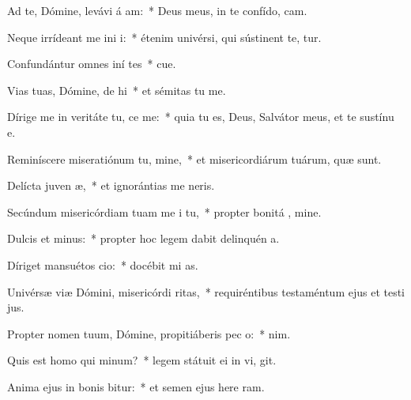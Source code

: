 \item Ad te, Dómine, levávi á am:~* Deus meus, in te confído,  cam.
\item Neque irrídeant me ini i:~* étenim univérsi, qui sústinent te,  tur.
\item Confundántur omnes iní tes~* cue.
\item Vias tuas, Dómine, de hi~* et sémitas tu  me.
\item Dírige me in veritáte tu,  ce me:~* quia tu es, Deus, Salvátor meus, et te sustínu  e.
\item Reminíscere miseratiónum tu, mine,~* et misericordiárum tuárum, quæ   sunt.
\item Delícta juven æ,~* et ignorántias me  neris.
\item Secúndum misericórdiam tuam me i tu,~* propter bonitá , mine.
\item Dulcis et  minus:~* propter hoc legem dabit delinquén  a.
\item Díriget mansuétos  cio:~* docébit mi  as.
\item Univérsæ viæ Dómini, misericórdi  ritas,~* requiréntibus testaméntum ejus et testi jus.
\item Propter nomen tuum, Dómine, propitiáberis pec o:~*   nim.
\item Quis est homo qui  minum?~* legem státuit ei in vi,  git.
\item Anima ejus in bonis bitur:~* et semen ejus here ram.
